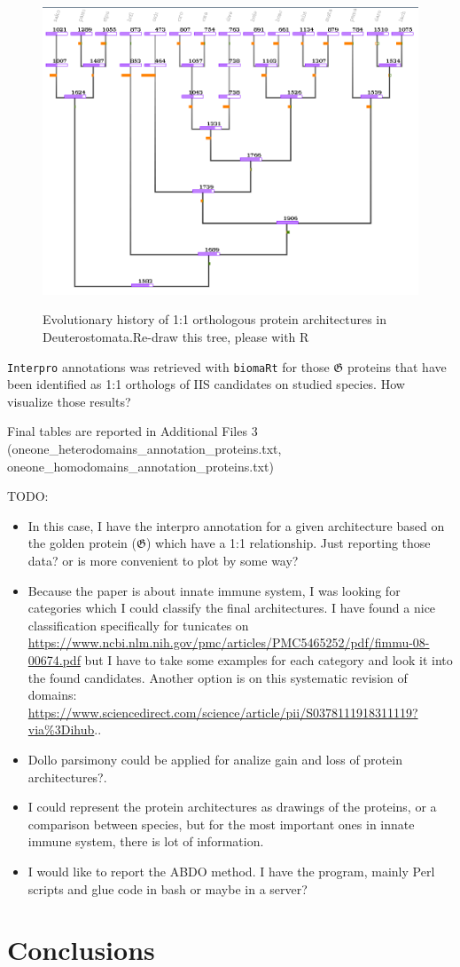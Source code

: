 \documentclass[11pt]{article}
\newcommand{\TODO}[1]{\begingroup\color{red}#1\endgroup}
\begin{document}
\begin{figure}[ht!]
\centering 
\includegraphics[scale=0.53]{figures/oneoneDollo} \\
\caption{Evolutionary history of 1:1 orthologous protein architectures in 
Deuterostomata.\TODO{Re-draw this tree, please with R}}\label{fig:dollooneone} 
\end{figure}

\texttt{Interpro} annotations was retrieved with \texttt{biomaRt} for 
those $\boldsymbol{\mathfrak{G}}$ proteins that have been identified
as 1:1 orthologs of IIS candidates on studied species.
\TODO{How visualize those results?}

\TODO{Final tables are reported in Additional Files 3 
(oneone\_heterodomains\_annotation\_proteins.txt, 
oneone\_homodomains\_annotation\_proteins.txt)}

\TODO{TODO:}
\begin{itemize}
\item \TODO{In this case, I have the interpro annotation for a given architecture based
on the golden protein ($\boldsymbol{\mathfrak{G}}$) which have a 1:1 relationship. Just
reporting those data? or is more convenient to plot by some way?}
\item \TODO{Because the paper is about innate immune system, I was looking for 
categories which I could classify the final architectures. I have found a nice classification
specifically for tunicates on \url{https://www.ncbi.nlm.nih.gov/pmc/articles/PMC5465252/pdf/fimmu-08-00674.pdf} but I have to take some examples for each category and look it into
the found candidates. Another option is on this systematic revision of domains: \url{https://www.sciencedirect.com/science/article/pii/S0378111918311119?via\%3Dihub}.}.
\item \TODO{Dollo parsimony could be applied for analize gain and loss of protein architectures?.}
\item \TODO{I could represent the protein architectures as drawings of the proteins, or a comparison between species, but for the most important ones in innate immune system, there is lot of information.}
\item \TODO{I would like to report the ABDO method. I have the program, mainly Perl scripts and glue code in bash or maybe in a server?}
\end{itemize}

\section*{Conclusions}


\end{document}
